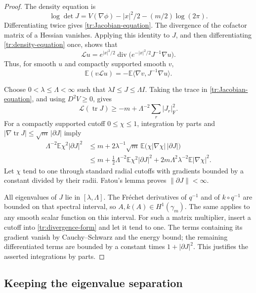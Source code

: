 \begin{proof}
The density equation is
\begin{equation}\label{tr:density-equation}
 \log\det J=V(\nabla\phi)-|x|^2/2-(m/2)\log(2\pi).
\end{equation}
Differentiating twice gives \eqref{tr:Jacobian-equation}.  The divergence
of the cofactor matrix of a Hessian vanishes.  Applying this identity
to $J$, and then differentiating \eqref{tr:density-equation} once,
shows that
\[
 \mathcal L u=e^{|x|^2/2}\operatorname{div}
       \bigl(e^{-|x|^2/2}J^{-1}\nabla u\bigr).
\]
Thus, for smooth $u$ and compactly supported smooth $v$,
\begin{equation}\label{tr:divergence-form}
 \mathbb E(v\mathcal Lu)
 =-\mathbb E\langle\nabla v,J^{-1}\nabla u\rangle.
\end{equation}

Choose $0<\lambda\le\Lambda<\infty$ such that
$\lambda I\le J\le\Lambda I$.  Taking the trace in
\eqref{tr:Jacobian-equation}, and using $D^2V\ge0$, gives
\[
 \mathcal L(\operatorname{tr}J)
 \ge-m+\Lambda^{-2}\sum_r|J_r|_{\mathrm F}^2.
\]
For a compactly supported cutoff $0\le\chi\le1$, integration by parts
and $|\nabla\operatorname{tr}J|\le\sqrt m\,|\partial J|$ imply
\begin{align*}
 \Lambda^{-2}\mathbb E\chi^2|\partial J|^2
 &\le m+2\lambda^{-1}\sqrt m\,
             \mathbb E\bigl(\chi|\nabla\chi|\,|\partial J|\bigr)\\
 &\le m+\tfrac12\Lambda^{-2}\mathbb E\chi^2|\partial J|^2
       +2m\Lambda^2\lambda^{-2}\mathbb E|\nabla\chi|^2.
\end{align*}
Let $\chi$ tend to one through standard radial cutoffs with gradients
bounded by a constant divided by their radii.  Fatou's lemma proves
$\|\partial J\|<\infty$.

All eigenvalues of $J$ lie in $[\lambda,\Lambda]$.  The Fr\'echet
derivatives of $q^{-1}$ and of $k\circ q^{-1}$ are bounded on that
spectral interval, so $A,k(A)\in H^1(\gamma_m)$.  The same applies to
any smooth scalar function on this interval.  For such a matrix
multiplier, insert a cutoff into \eqref{tr:divergence-form} and let it
tend to one.  The terms containing its gradient vanish by
Cauchy--Schwarz and the energy bound; the remaining differentiated
terms are bounded by a constant times $1+|\partial J|^2$.
This justifies the asserted integrations by parts.
\end{proof}

\subsection{Keeping the eigenvalue separation}

